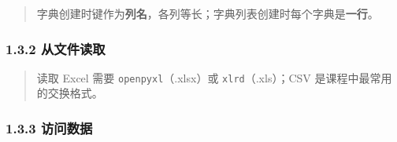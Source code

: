 \begin{Shaded}
\begin{Highlighting}[]
\end{Highlighting}
\end{Shaded}

\begin{quote}
字典创建时键作为\textbf{列名}，各列等长；字典列表创建时每个字典是\textbf{一行}。
\end{quote}

\subsubsection{1.3.2 从文件读取}\label{ux4eceux6587ux4ef6ux8bfbux53d6}

\begin{Shaded}
\begin{Highlighting}[]
\end{Highlighting}
\end{Shaded}

\begin{quote}
读取 Excel 需要 \texttt{openpyxl}（.xlsx）或 \texttt{xlrd}（.xls）；CSV
是课程中最常用的交换格式。
\end{quote}

\subsubsection{1.3.3 访问数据}\label{ux8bbfux95eeux6570ux636e}


